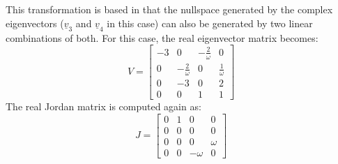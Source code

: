 			\indent This transformation is based in that the nullspace generated by the complex eigenvectors ($\underline{v}_3$ and $\underline{v}_4$ in this case) can also be generated by two linear combinations of both. For this case, the real eigenvector matrix becomes:
			\begin{equation}
			V = \left[ \begin{array}{cccc}
			-3 	& 0					& -\frac{2}{\omega}	& 0	\\
			0 	& -\frac{2}{\omega}	& 0  				& \frac{1}{\omega} 	\\
			0 	& -3				& 0					& 2				\\
			0 	& 0					& 1 				& 1
			\end{array}\right]
			\label{eqCh2:V_real}
			\end{equation}
			\indent The real Jordan matrix is computed again as:
			\begin{equation}
			J = \left[ \begin{array}{cccc}
			0 	& 1	& 0		& 0			\\
			0 	& 0						& 0  	& 0 		\\
			0 	& 0						& 0		& \omega	\\
			0 	& 0						& -\omega 	& 0
			\end{array}\right]
			\label{eqCh2:J_real}
			\end{equation}
